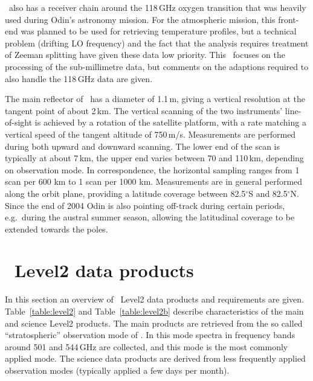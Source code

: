 \smr\ also has a receiver chain around the 118\,GHz oxygen transition that was
heavily used during Odin's astronomy mission. For the atmospheric mission, this
front-end was planned to be used for retrieving temperature profiles, but a
technical problem (drifting LO frequency) and the fact that the analysis
requires treatment of Zeeman splitting have given these data low priority. This
\ATBD\ focuses on the processing of the sub-millimetre data, but comments on the
adaptions required to also handle the 118\,GHz data are given.

The main reflector of \smr\ has a diameter of 1.1\,m, giving a
vertical resolution at the tangent point of about 2\,km. The vertical scanning
of the two instruments' line-of-sight is achieved by a rotation of the satellite
platform, with a rate matching a vertical speed of the tangent altitude of
750\,m/s. Measurements are performed during both upward and downward scanning.
The lower end of the scan is typically at about 7\,km, the upper end varies
between 70 and 110\,km, depending on observation mode. In correspondence,
the horizontal sampling ranges from 1 scan per 600 km to 1 scan per 1000 km.
Measurements are in general performed along the orbit plane, providing a
latitude coverage between 82.5$^{\circ}$S and 82.5$^{\circ}$N. Since the end of
2004 Odin is also pointing off-track during certain periods, e.g.\ during the
austral summer season, allowing the latitudinal coverage to be extended towards
the poles. 


\section{\smr\ Level2 data products}
In this section an overview of \smr\ Level2 data products and requirements are given.
Table~\ref{table:level2} and Table~\ref{table:level2b} describe characteristics of the main 
and science Level2 products.
The main products are retrieved from the so called ``stratospheric'' observation mode
of \smr. In this mode spectra in frequency bands around 501 and 544\,GHz are collected,
and this mode is the most commonly applied mode.
The science data products are derived from less frequently applied observation modes
(typically applied a few days per month).  




